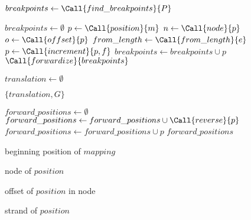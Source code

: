 
\begin{algorithm}
  \begin{algorithmic}
    
    \State {}
    \State $breakpoints \gets \Call{find\_breakpoints}{P}$
    \EndFunction


    \State {}
    \State $breakpoints \gets \emptyset$
    \State $p \gets \Call{position}{m}$
    \State $n \gets \Call{node}{p}$
    \State $o \gets \Call{offset}{p}$
    \State $from\_length \gets \Call{from\_length}{e}$
    \State $p \gets \Call{increment}{p, f}$
    \State $breakpoints \gets breakpoints \cup p$
    \EndIf
    \EndFor
    \EndFor
    \EndFor
    \Return $\Call{forwardize}{breakpoints}$
    \EndFunction

    \State $translation \gets \emptyset$
    
    \Return $\{ translation, G \}$
    \EndFunction

    \State {}
    \State $forward\_positions \gets \emptyset$
    \State $forward\_positions \gets forward\_positions \cup \Call{reverse}{p}$
    \Else
    \State $forward\_positions \gets forward\_positions \cup p$
    \EndIf
    \EndFor
    \Return $forward\_positions$
    \EndFunction

    \Return beginning position of $mapping$
    \EndFunction

    \Return node of $position$
    \EndFunction

    \Return offset of $position$ in node
    \EndFunction

    \Return strand of $position$
    \EndFunction


\end{algorithmic}
\end{algorithm}
